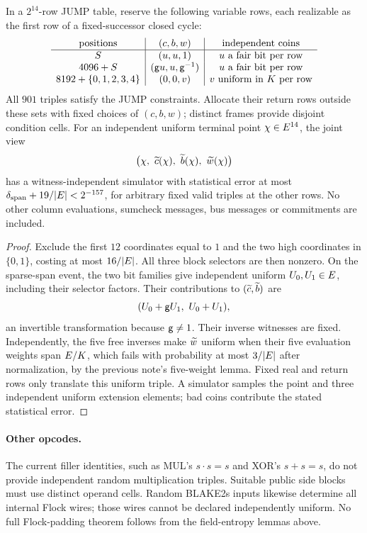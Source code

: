 \begin{theorem}\label{thm:jump-terminals}
In a $2^{14}$-row JUMP table, reserve the following variable rows, each realizable as the first row of a fixed-successor closed cycle:
\[
\begin{array}{c|c|c}
\text{positions} & (c,b,w) & \text{independent coins}\\\hline
S & (u,u,1) & u\text{ a fair bit per row}\\
4096+S & (\mathsf{g} u,u,\mathsf{g}^{-1}) & u\text{ a fair bit per row}\\
8192+\{0,1,2,3,4\} & (0,0,v) & v\text{ uniform in }K\text{ per row}
\end{array}
\]
All $901$ triples satisfy the JUMP constraints. Allocate their return rows outside these sets with fixed choices of $(c,b,w)$; distinct frames provide disjoint condition cells. For an independent uniform terminal point $\chi\in E^{14}$, the joint view
\[
 \bigl(\fc,\ \mle c(\fc),\ \mle b(\fc),\ \mle w(\fc)\bigr)
\]
has a witness-independent simulator with statistical error at most $\delta_{\mathrm{span}}+19/|E|<2^{-157}$, for arbitrary fixed valid triples at the other rows. No other column evaluations, sumcheck messages, bus messages or commitments are included.
\end{theorem}
\begin{proof}
Exclude the first $12$ coordinates equal to $1$ and the two high coordinates in $\{0,1\}$, costing at most $16/|E|$. All three block selectors are then nonzero. On the sparse-span event, the two bit families give independent uniform $U_0,U_1\in E$, including their selector factors. Their contributions to $(\widetilde{c},\widetilde{b})$ are
\[
 (U_0+\gen U_1,\ U_0+U_1),
\]
an invertible transformation because $\mathsf{g}\ne1$. Their inverse witnesses are fixed. Independently, the five free inverses make $\widetilde{w}$ uniform when their five evaluation weights span $E/K$, which fails with probability at most $3/|E|$ after normalization, by the previous note's five-weight lemma. Fixed real and return rows only translate this uniform triple. A simulator samples the point and three independent uniform extension elements; bad coins contribute the stated statistical error.
\end{proof}

\paragraph{Other opcodes.} The current filler identities, such as MUL's $s\cdot s=s$ and XOR's $s+s=s$, do not provide independent random multiplication triples. Suitable public side blocks must use distinct operand cells. Random BLAKE2s inputs likewise determine all internal Flock wires; those wires cannot be declared independently uniform. No full Flock-padding theorem follows from the field-entropy lemmas above.


